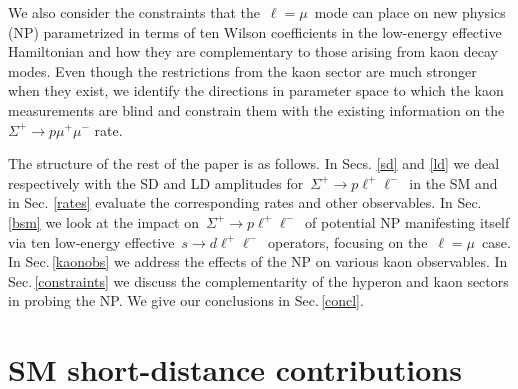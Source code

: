 \documentclass[amsmath,amssymb,aps,nofootinbib,prd,preprint,superscriptaddress,tightenlines,a4paper,bm]{revtex4-2}
\begin{document}
We also consider the constraints that the \,$\ell=\mu$\, mode can place on new physics (NP) parametrized in terms of ten Wilson coefficients in the low-energy effective Hamiltonian and how they are complementary to those arising from kaon decay modes.
Even though the restrictions from the kaon sector are much stronger when they exist, we identify the directions in parameter space to which the kaon measurements are blind and constrain them with the existing information on the $\Sigma^+\to p\mu^+\mu^-$ rate.

The structure of the rest of the paper is as follows.
In Secs.\,\,\ref{sd} and \ref{ld} we deal respectively with the SD and LD amplitudes for \,$\Sigma^+\to p\ell^+\ell^-$\, in the SM and in Sec.\,\,\ref{rates} evaluate the corresponding rates and other observables.
In Sec.\,\ref{bsm} we look at the impact on \,$\Sigma^+\to p\ell^+\ell^-$\, of potential NP manifesting itself via ten low-energy effective \,$s\to d\ell^+\ell^-$\, operators, focusing on the \,$\ell=\mu$\, case.
In Sec.\,\ref{kaonobs} we address the effects of the NP on various kaon observables.
In Sec.\,\ref{constraints} we discuss the complementarity of the hyperon and kaon sectors in probing the NP.
We give our conclusions in Sec.\,\ref{concl}.

\section{SM short-distance contributions\label{sd}}
\end{document}
